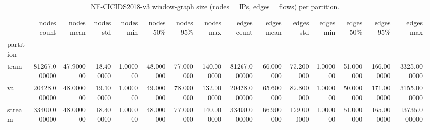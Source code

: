 \begin{table}
\caption{NF-CICIDS2018-v3 window-graph size (nodes = IPs, edges = flows) per partition.}
\label{tab:table6_graph_statistics}
\begin{tabular}{lrrrrrrrrrrrrrr}
\toprule
 & nodes count & nodes mean & nodes std & nodes min & nodes 50\% & nodes 95\% & nodes max & edges count & edges mean & edges std & edges min & edges 50\% & edges 95\% & edges max \\
partition &  &  &  &  &  &  &  &  &  &  &  &  &  &  \\
\midrule
train & 81267.000000 & 47.900000 & 18.400000 & 1.000000 & 48.000000 & 77.000000 & 140.000000 & 81267.000000 & 66.000000 & 73.200000 & 1.000000 & 51.000000 & 166.000000 & 3325.000000 \\
val & 20428.000000 & 48.000000 & 19.100000 & 1.000000 & 49.000000 & 78.000000 & 132.000000 & 20428.000000 & 65.600000 & 82.800000 & 1.000000 & 50.000000 & 171.000000 & 3155.000000 \\
stream & 33400.000000 & 48.000000 & 18.400000 & 1.000000 & 48.000000 & 77.000000 & 140.000000 & 33400.000000 & 66.900000 & 129.000000 & 1.000000 & 51.000000 & 165.000000 & 13735.000000 \\
\bottomrule
\end{tabular}
\end{table}
